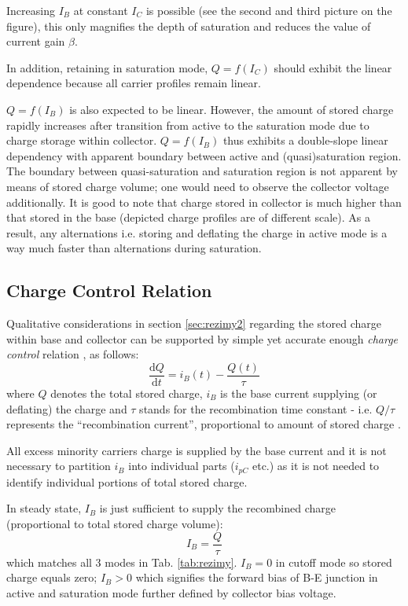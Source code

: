\documentclass[conference]{IEEEtran}
\newcommand{\dxdt}[2]{\frac{\mathrm{d} #1}{\mathrm{d} #2}}
\begin{document}
Increasing $I_B$ at constant $I_C$ is possible (see the second and third picture on the figure), this only magnifies the depth of saturation and reduces the value of current gain $\beta$.

In addition, retaining in saturation mode, $Q=f(I_C)$ should exhibit the linear dependence because all carrier profiles remain linear.

$Q=f(I_B)$ is also expected to be linear. However, the amount of stored charge rapidly increases after transition from active to the saturation mode due to charge storage within collector. $Q=f(I_B)$ thus exhibits a double-slope linear dependency with apparent boundary between active and (quasi)saturation region.
The boundary between quasi-saturation and saturation region is not apparent by means of stored charge volume; one would need to observe the collector voltage additionally.
It is good to note that charge stored in collector is much higher than that stored in the base (depicted charge profiles are of different scale). As a result, any alternations i.e. storing and deflating the charge in active mode is a way much faster than alternations during saturation.


\subsection{Charge Control Relation} \label{sec:charge_control}

Qualitative considerations in section \ref{sec:rezimy2} regarding the stored charge within base and collector can be supported by simple yet accurate enough \textit{charge control} relation \cite{gummel}, \cite{sze} as follows:
\begin{equation}
    \dxdt{Q}{t} = i_{B}(t) - \frac{Q(t)}{\tau}
    \label{eq:charge_control_Ib}
\end{equation}
where $Q$ denotes the total stored charge, $i_B$ is the base current supplying (or deflating) the charge and $\tau$ stands for the recombination time constant - i.e. $Q/\tau$ represents the ``recombination current'', proportional to amount of stored charge \cite{pierret}.

All excess minority carriers charge is supplied by the base current and it is not necessary to partition $i_B$ into individual parts ($i_{pC}$ etc.) as it is not needed to identify individual portions of total stored charge.

In steady state, $I_B$ is just sufficient to supply the recombined charge (proportional to total stored charge volume):
\begin{equation}
    I_B = \frac{Q}{\tau}
    \label{eq:charge_control_steady}
\end{equation}
which matches all 3 modes in Tab. \ref{tab:rezimy}. $I_B = 0$ in cutoff mode so stored charge equals zero; $I_B > 0$ which signifies the forward bias of B-E junction in active and saturation mode further defined by collector bias voltage.
\end{document}
